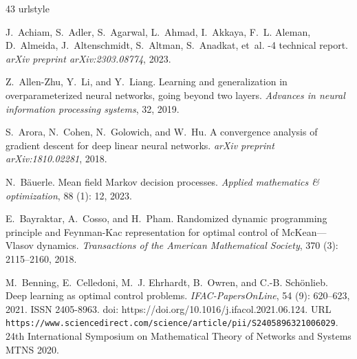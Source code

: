 \documentclass[11pt]{article}
\begin{document}
%
\begin{thebibliography}{43}
\providecommand{\natexlab}[1]{#1}
\providecommand{\url}[1]{\texttt{#1}}
\expandafter\ifx\csname urlstyle\endcsname\relax
  \providecommand{\doi}[1]{doi: #1}\else
  \providecommand{\doi}{doi: \begingroup \urlstyle{rm}\Url}\fi

J.~Achiam, S.~Adler, S.~Agarwal, L.~Ahmad, I.~Akkaya, F.~L. Aleman, D.~Almeida, J.~Altenschmidt, S.~Altman, S.~Anadkat, et~al.
-4 technical report.
\newblock \emph{arXiv preprint arXiv:2303.08774}, 2023.

Z.~Allen-Zhu, Y.~Li, and Y.~Liang.
\newblock Learning and generalization in overparameterized neural networks, going beyond two layers.
\newblock \emph{Advances in neural information processing systems}, 32, 2019.

S.~Arora, N.~Cohen, N.~Golowich, and W.~Hu.
\newblock A convergence analysis of gradient descent for deep linear neural networks.
\newblock \emph{arXiv preprint arXiv:1810.02281}, 2018.

N.~B{\"a}uerle.
\newblock Mean field {Markov} decision processes.
\newblock \emph{Applied mathematics \& optimization}, 88 (1): 12, 2023.

E.~Bayraktar, A.~Cosso, and H.~Pham.
\newblock Randomized dynamic programming principle and {F}eynman-{K}ac representation for optimal control of {M}c{K}ean---{V}lasov dynamics.
\newblock \emph{Transactions of the American Mathematical Society}, 370 (3): 2115--2160, 2018.

M.~Benning, E.~Celledoni, M.~J. Ehrhardt, B.~Owren, and C.-B. Schönlieb.
\newblock Deep learning as optimal control problems.
\newblock \emph{IFAC-PapersOnLine}, 54 (9): 620--623, 2021.
\newblock ISSN 2405-8963.
\newblock \doi{https://doi.org/10.1016/j.ifacol.2021.06.124}.
\newblock URL \url{https://www.sciencedirect.com/science/article/pii/S2405896321006029}.
\newblock 24th International Symposium on Mathematical Theory of Networks and Systems MTNS 2020.


\end{thebibliography}
\end{document}
